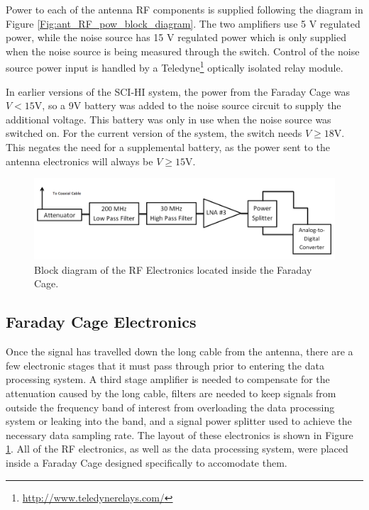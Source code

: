 Power to each of the antenna RF components is supplied following the diagram in Figure \ref{Fig:ant_RF_pow_block_diagram}. The two amplifiers use 5 V regulated power, while the noise source has 15 V regulated power which is only supplied when the noise source is being measured through the switch. Control of the noise source power input is handled by a Teledyne\footnote{\url{http://www.teledynerelays.com/}} optically isolated relay module. 

In earlier versions of the SCI-HI system, the power from the Faraday Cage was $V< 15$V, so a 9V battery was added to the noise source circuit to supply the additional voltage. This battery was only in use when the noise source was switched on. For the current version of the system, the switch needs $V \geq 18$V. This negates the need for a supplemental battery, as the power sent to the antenna electronics will always be $V \geq 15$V.  

\begin{figure}[htb]
\begin{center}
\includegraphics[width=0.9\linewidth]{SCIHI_system/figures/faraday_cage_rf_block_diagram.png}
\caption{Block diagram of the RF Electronics located inside the Faraday Cage.}
\label{Fig:fcage_RF_block_diagram}
\end{center}
\end{figure}


\subsection{Faraday Cage Electronics}

Once the signal has travelled down the long cable from the antenna, there are a few electronic stages that it must pass through prior to entering the data processing system. A third stage amplifier is needed to compensate for the attenuation caused by the long cable, filters are needed to keep signals from outside the frequency band of interest from overloading the data processing system or leaking into the band, and a signal power splitter used to achieve the necessary data sampling rate. The layout of these electronics is shown in Figure \ref{Fig:fcage_RF_block_diagram}. All of the RF electronics, as well as the data processing system, were placed inside a Faraday Cage designed specifically to accomodate them. 

